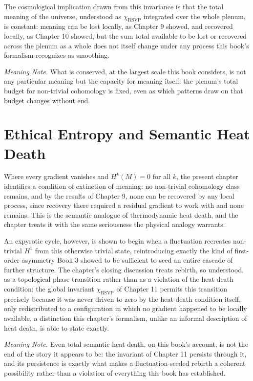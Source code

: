 The cosmological implication drawn from this invariance is that the total meaning of the universe, understood as $\chi_{\mathrm{RSVP}}$ integrated over the whole plenum, is constant: meaning can be lost locally, as Chapter 9 showed, and recovered locally, as Chapter 10 showed, but the sum total available to be lost or recovered across the plenum as a whole does not itself change under any process this book's formalism recognizes as smoothing.

\emph{Meaning Note.} What is conserved, at the largest scale this book considers, is not any particular meaning but the capacity for meaning itself: the plenum's total budget for non-trivial cohomology is fixed, even as which patterns draw on that budget changes without end.

\chapter{Ethical Entropy and Semantic Heat Death}

Where every gradient vanishes and $H^k(M) = 0$ for all $k$, the present chapter identifies a condition of extinction of meaning: no non-trivial cohomology class remains, and by the results of Chapter 9, none can be recovered by any local process, since recovery there required a residual gradient to work with and none remains. This is the semantic analogue of thermodynamic heat death, and the chapter treats it with the same seriousness the physical analogy warrants.

An expyrotic cycle, however, is shown to begin when a fluctuation recreates non-trivial $H^1$ from this otherwise trivial state, reintroducing exactly the kind of first-order asymmetry Book 3 showed to be sufficient to seed an entire cascade of further structure. The chapter's closing discussion treats rebirth, so understood, as a topological phase transition rather than as a violation of the heat-death condition: the global invariant $\chi_{\mathrm{RSVP}}$ of Chapter 11 permits this transition precisely because it was never driven to zero by the heat-death condition itself, only redistributed to a configuration in which no gradient happened to be locally available, a distinction this chapter's formalism, unlike an informal description of heat death, is able to state exactly.

\emph{Meaning Note.} Even total semantic heat death, on this book's account, is not the end of the story it appears to be: the invariant of Chapter 11 persists through it, and its persistence is exactly what makes a fluctuation-seeded rebirth a coherent possibility rather than a violation of everything this book has established.

